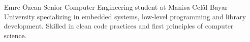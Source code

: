 \documentclass[a4paper,journal]{IEEEtran}
\begin{document}

%
%
%

%

\begin{IEEEbiography}{Emre Özcan}
Senior Computer Engineering student at Manisa Celâl Bayar University
specializing in embedded systems, low-level programming and library development.
Skilled in clean code practices and first principles of computer science.
\end{IEEEbiography}
\end{document}
